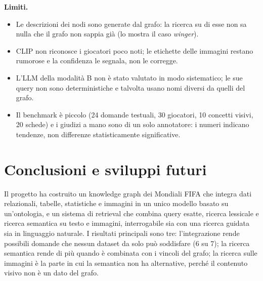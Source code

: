 \documentclass[11pt,a4paper]{article}
\begin{document}
\textbf{Limiti.}
\begin{itemize}
  \item Le descrizioni dei nodi sono generate dal grafo: la ricerca su di esse non sa nulla che il grafo non sappia già (lo mostra il caso \emph{winger}).
  \item CLIP non riconosce i giocatori poco noti; le etichette delle immagini restano rumorose e la confidenza le segnala, non le corregge.
  \item L'LLM della modalità B non è stato valutato in modo sistematico; le sue query non sono deterministiche e talvolta usano nomi diversi da quelli del grafo.
  \item Il benchmark è piccolo (24 domande testuali, 30 giocatori, 10 concetti visivi, 20 schede) e i giudizi a mano sono di un solo annotatore: i numeri indicano tendenze, non differenze statisticamente significative.
  
\end{itemize}

\section{Conclusioni e sviluppi futuri}
Il progetto ha costruito un knowledge graph dei Mondiali FIFA che integra dati relazionali, tabelle, statistiche e immagini in un unico modello basato su un'ontologia, e un sistema di retrieval che combina query esatte, ricerca lessicale e ricerca semantica su testo e immagini, interrogabile sia con una ricerca guidata sia in linguaggio naturale. I risultati principali sono tre: l'integrazione rende possibili domande che nessun dataset da solo può soddisfare (6 su 7); la ricerca semantica rende di più quando è combinata con i vincoli del grafo; la ricerca sulle immagini è la parte in cui la semantica non ha alternative, perché il contenuto visivo non è un dato del grafo.
\end{document}

